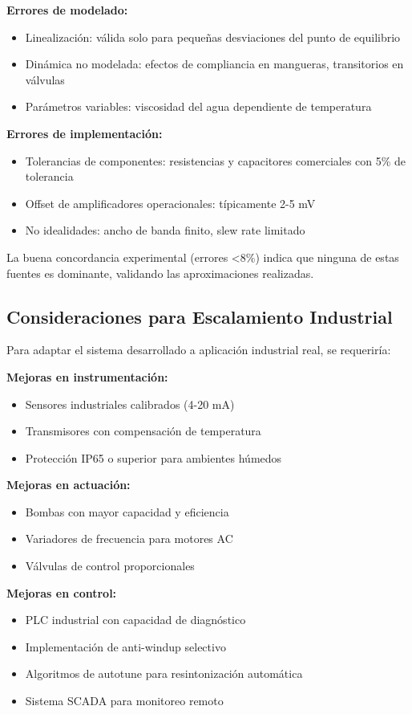 \documentclass[conference]{IEEEtran}
\begin{document}
\textbf{Errores de modelado:}
\begin{itemize}
\item Linealización: válida solo para pequeñas desviaciones del punto de equilibrio
\item Dinámica no modelada: efectos de compliancia en mangueras, transitorios en válvulas
\item Parámetros variables: viscosidad del agua dependiente de temperatura
\end{itemize}

\textbf{Errores de implementación:}
\begin{itemize}
\item Tolerancias de componentes: resistencias y capacitores comerciales con 5\% de tolerancia
\item Offset de amplificadores operacionales: típicamente 2-5 mV
\item No idealidades: ancho de banda finito, slew rate limitado
\end{itemize}

La buena concordancia experimental (errores <8\%) indica que ninguna de estas fuentes es dominante, validando las aproximaciones realizadas.

\subsection{Consideraciones para Escalamiento Industrial}

Para adaptar el sistema desarrollado a aplicación industrial real, se requeriría:

\textbf{Mejoras en instrumentación:}
\begin{itemize}
\item Sensores industriales calibrados (4-20 mA)
\item Transmisores con compensación de temperatura
\item Protección IP65 o superior para ambientes húmedos
\end{itemize}

\textbf{Mejoras en actuación:}
\begin{itemize}
\item Bombas con mayor capacidad y eficiencia
\item Variadores de frecuencia para motores AC
\item Válvulas de control proporcionales
\end{itemize}

\textbf{Mejoras en control:}
\begin{itemize}
\item PLC industrial con capacidad de diagnóstico
\item Implementación de anti-windup selectivo
\item Algoritmos de autotune para resintonización automática
\item Sistema SCADA para monitoreo remoto
\end{itemize}
\end{document}
